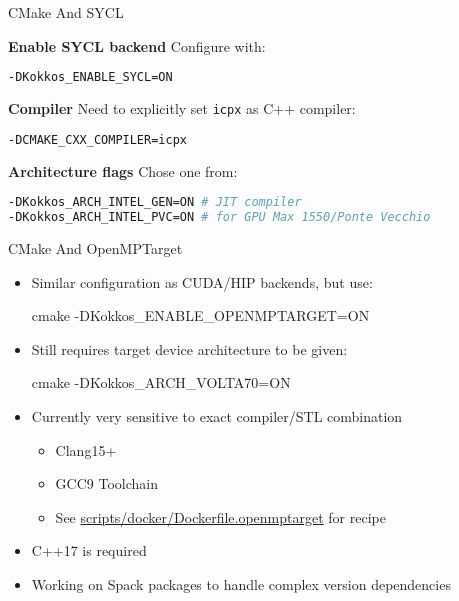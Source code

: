 \begin{frame}[fragile]{CMake And SYCL}

\textbf{Enable SYCL backend}
Configure with:
\begin{lstlisting}[language=bash]
-DKokkos_ENABLE_SYCL=ON
\end{lstlisting}

\textbf{Compiler}
 Need to explicitly set \texttt{icpx} as C++ compiler:
\begin{lstlisting}[language=bash]
-DCMAKE_CXX_COMPILER=icpx
\end{lstlisting}

\textbf{Architecture flags}
Chose one from:
\begin{lstlisting}[language=bash]
-DKokkos_ARCH_INTEL_GEN=ON # JIT compiler
-DKokkos_ARCH_INTEL_PVC=ON # for GPU Max 1550/Ponte Vecchio
\end{lstlisting}

\end{frame}

\begin{frame}[fragile]{CMake And OpenMPTarget}
\begin{itemize}
\item Similar configuration as CUDA/HIP backends, but use:
\begin{shell}
cmake -DKokkos_ENABLE_OPENMPTARGET=ON
\end{shell}
\item Still requires target device architecture to be given:
\begin{shell}
cmake -DKokkos_ARCH_VOLTA70=ON
\end{shell}
\item Currently very sensitive to exact compiler/STL combination
\begin{itemize}
\item Clang15+
\item GCC9 Toolchain
\item See \url{scripts/docker/Dockerfile.openmptarget} for recipe
\end{itemize}
\item C++17 is required
\item Working on Spack packages to handle complex version dependencies
\end{itemize}
\end{frame}

